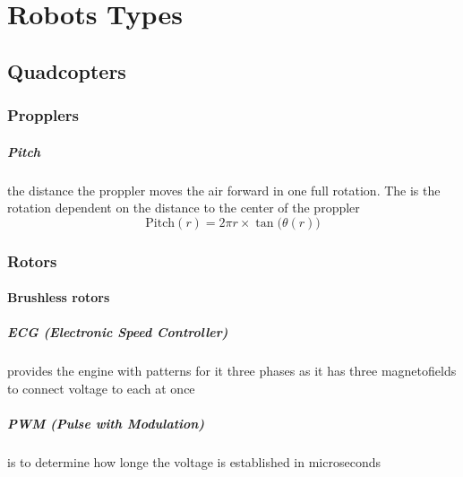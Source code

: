 \chapter{Robots Types}
\section{Quadcopters}
    \subsection{Propplers}
        \paragraph{Pitch}
            the distance the proppler moves the air forward in one full rotation.
            The \theta is the rotation dependent on the distance to the center of the proppler
            \[
            \text{Pitch}(r) = 2\pi r \times \tan\big(\theta(r)\big)
            \]
    \subsection{Rotors}
        
        \subsubsection{Brushless rotors}
            \paragraph{ECG (Electronic Speed Controller)}
                provides the engine with patterns for it three phases as it has three magnetofields to connect voltage to each at once
            \paragraph{PWM (Pulse with Modulation)}
                is to determine how longe the voltage is established in microseconds
